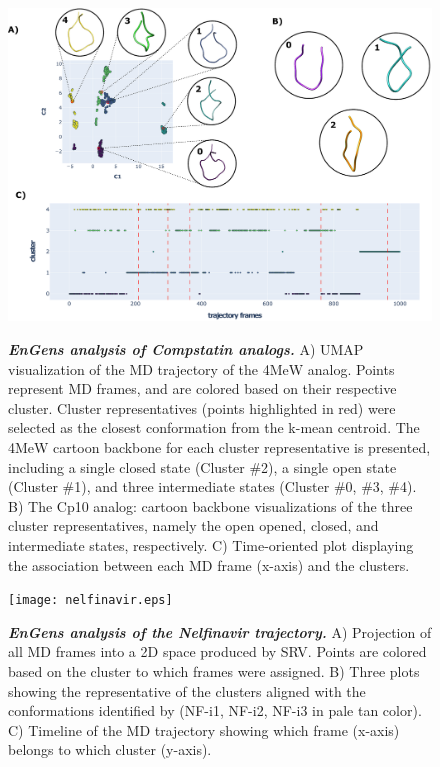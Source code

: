 \documentclass[numsec,webpdf,contemporary,large]{oup-authoring-template}
\theoremstyle{thmstyleone}%
\theoremstyle{thmstyletwo}%
\theoremstyle{thmstylethree}%
\begin{document}
\begin{figure}[!t]%
\centering
{\includegraphics[scale=0.2]{compstatin.eps}}
\caption{\textbf{\textit{ EnGens analysis of Compstatin analogs.}} A) UMAP visualization of the MD trajectory of the 4MeW analog. Points represent MD frames, and are colored based on their respective cluster. Cluster representatives (points highlighted in red) were selected as the closest conformation from the k-mean centroid. The 4MeW cartoon backbone for each cluster representative is presented, including a single closed state (Cluster \#2), a single open state (Cluster \#1), and three intermediate states (Cluster \#0, \#3, \#4). B) The Cp10 analog: cartoon backbone visualizations of the three cluster representatives, namely the open opened, closed, and intermediate states, respectively. C) Time-oriented plot displaying the association between each MD frame (x-axis) and the clusters.}
\label{fig-res2}
\end{figure}

\begin{figure}[!t]%
\centering
{\texttt{[image: nelfinavir.eps]}}
\caption{\textbf{\textit{EnGens analysis of the Nelfinavir trajectory. }} A) Projection of all MD frames into a 2D space produced by SRV. Points are colored based on the cluster to which frames were assigned. B) Three plots showing the representative of the clusters aligned with the conformations identified by \cite{antunes_new_2014} (NF-i1, NF-i2, NF-i3 in pale tan color). C) Timeline of the MD trajectory showing which frame (x-axis) belongs to which cluster (y-axis).}
\label{fig-res3}
\end{figure}
\end{document}
